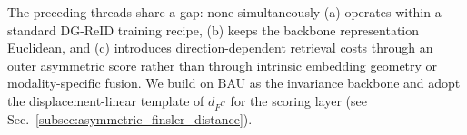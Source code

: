 
The preceding threads share a gap: none simultaneously (a) operates within a standard DG-ReID training recipe, (b) keeps the backbone representation Euclidean, and (c) introduces direction-dependent retrieval costs through an outer asymmetric score rather than through intrinsic embedding geometry or modality-specific fusion. We build on BAU \cite{cho2024generalizable} as the invariance backbone and adopt the displacement-linear template of $d_{F^{C}}$ for the scoring layer (see Sec.~\ref{subsec:asymmetric_finsler_distance}).